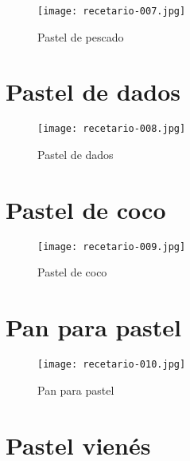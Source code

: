 \documentclass[12pt,letterpaper]{article}
\begin{document}
    \begin{figure}[H]
      \vspace{2pt}
    \texttt{[image: recetario-007.jpg]}
      \caption{Pastel de pescado}
      
    \end{figure}

\newpage

  \section{Pastel de dados}
  
    \begin{figure}[H]
      \vspace{2pt}
    \texttt{[image: recetario-008.jpg]}
      \caption{Pastel de dados}
      
    \end{figure}


\newpage

  \section{Pastel de coco}
  
    \begin{figure}[H]
      \vspace{2pt}
    \texttt{[image: recetario-009.jpg]}
      \caption{Pastel de coco}
      
    \end{figure}


\newpage

  \section{Pan para pastel}
  
    \begin{figure}[H]
      \vspace{2pt}
    \texttt{[image: recetario-010.jpg]}
      \caption{Pan para pastel}
      
    \end{figure}


\newpage

  \section{Pastel vienés}
  
\end{document}
